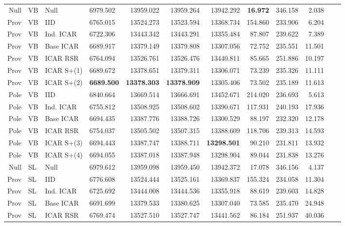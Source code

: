 \documentclass[openany]{book}
\begin{document}
\begin{appendices}
\begin{table}[ht]
{\begin{tabular}{rlllrrrrrrrr}
  Null & VB & Null & 6979.502 & 13959.022 & 13959.264 & 13942.292 & \textbf{16.972} & 346.158 & 2.038 \\ 
  Prov & VB & IID & 6765.015 & 13524.273 & 13523.594 & 13368.734 & 154.860 & 233.906 & 6.204 \\ 
  Prov & VB & Ind. ICAR & 6722.306 & 13443.342 & 13443.291 & 13355.484 & 87.807 & 239.622 & 7.389 \\ 
  Prov & VB & Base ICAR & 6689.917 & 13379.149 & 13379.808 & 13307.056 & 72.752 & 235.551 & 11.501 \\ 
  Prov & VB & ICAR RSR & 6764.094 & 13526.761 & 13526.476 & 13440.811 & 85.665 & 251.886 & 10.197 \\ 
  Prov & VB & ICAR S+(1) & 6689.672 & 13378.651 & 13379.311 & 13306.071 & 73.239 & 235.326 & 11.111 \\ 
  Prov & VB & ICAR S+(2) & \textbf{6689.500} & \textbf{13378.303} & \textbf{13378.909} & 13305.406 & 73.502 & 235.189 & 11.613 \\ 
  Pole & VB & IID & 6840.664 & 13669.514 & 13666.691 & 13452.671 & 214.020 & 236.693 & 5.613 \\ 
  Pole & VB & Ind. ICAR & 6755.812 & 13508.925 & 13508.602 & 13390.671 & 117.931 & 240.193 & 17.936 \\ 
  Pole & VB & Base ICAR & 6694.435 & 13387.776 & 13388.726 & 13300.529 & 88.197 & 232.320 & 12.178 \\ 
  Pole & VB & ICAR RSR & 6754.037 & 13505.502 & 13507.315 & 13388.609 & 118.706 & 239.313 & 14.593 \\ 
  Pole & VB & ICAR S+(3) & 6694.443 & 13387.747 & 13388.711 & \textbf{13298.501} & 90.210 & 231.811 & 13.932 \\ 
  Pole & VB & ICAR S+(4) & 6694.055 & 13387.018 & 13387.948 & 13298.904 & 89.044 & 231.838 & 13.276 \\ 
  \midrule
  Null & SL & Null & 6979.612 & 13959.098 & 13959.450 & 13942.372 & 17.078 & 346.156 & 4.137 \\ 
  Prov & SL & IID & 6776.608 & 13524.444 & 13525.161 & 13369.837 & 155.324 & 234.058 & 11.304 \\ 
  Prov & SL & Ind. ICAR & 6725.692 & 13444.008 & 13444.536 & 13355.918 & 88.619 & 239.603 & 14.828 \\ 
  Prov & SL & Base ICAR & 6691.699 & 13379.533 & 13380.625 & 13307.040 & 73.585 & 235.470 & 24.948 \\ 
  Prov & SL & ICAR RSR & 6769.474 & 13527.510 & 13527.747 & 13441.562 & 86.184 & 251.937 & 40.036 \\ 

\end{tabular}}
\end{table}
\end{appendices}
\end{document}
